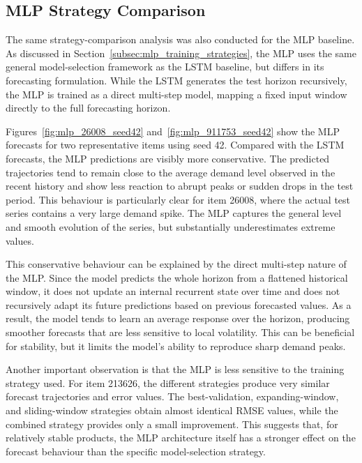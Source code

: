 \subsection{MLP Strategy Comparison}
\label{subsec:mlp_results_strategy_comparison}

The same strategy-comparison analysis was also conducted for the MLP baseline. As discussed in Section~\ref{subsec:mlp_training_strategies}, the MLP uses the same general model-selection framework as the LSTM baseline, but differs in its forecasting formulation. While the LSTM generates the test horizon recursively, the MLP is trained as a direct multi-step model, mapping a fixed input window directly to the full forecasting horizon.

Figures~\ref{fig:mlp_26008_seed42} and~\ref{fig:mlp_911753_seed42} show the MLP forecasts for two representative items using seed 42. Compared with the LSTM forecasts, the MLP predictions are visibly more conservative. The predicted trajectories tend to remain close to the average demand level observed in the recent history and show less reaction to abrupt peaks or sudden drops in the test period. This behaviour is particularly clear for item 26008, where the actual test series contains a very large demand spike. The MLP captures the general level and smooth evolution of the series, but substantially underestimates extreme values.

This conservative behaviour can be explained by the direct multi-step nature of the MLP. Since the model predicts the whole horizon from a flattened historical window, it does not update an internal recurrent state over time and does not recursively adapt its future predictions based on previous forecasted values. As a result, the model tends to learn an average response over the horizon, producing smoother forecasts that are less sensitive to local volatility. This can be beneficial for stability, but it limits the model's ability to reproduce sharp demand peaks.

Another important observation is that the MLP is less sensitive to the training strategy used. For item 213626, the different strategies produce very similar forecast trajectories and error values. The best-validation, expanding-window, and sliding-window strategies obtain almost identical RMSE values, while the combined strategy provides only a small improvement. This suggests that, for relatively stable products, the MLP architecture itself has a stronger effect on the forecast behaviour than the specific model-selection strategy.

